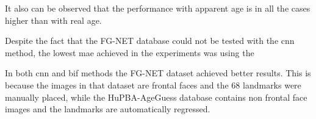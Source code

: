 It also can be observed that the performance with apparent age is in all the cases higher than with real age.

Despite the fact that the FG-NET database could not be tested with the \gls{cnn} method, the lowest \gls{mae} achieved in the experiments was using the 

In both \gls{cnn} and \gls{bif} methods the FG-NET dataset achieved better results. This is because the images in that dataset are frontal faces and the 68 landmarks were manually placed, while the HuPBA-AgeGuess database contains non frontal face images and the landmarks are automatically regressed.

		
		
		
